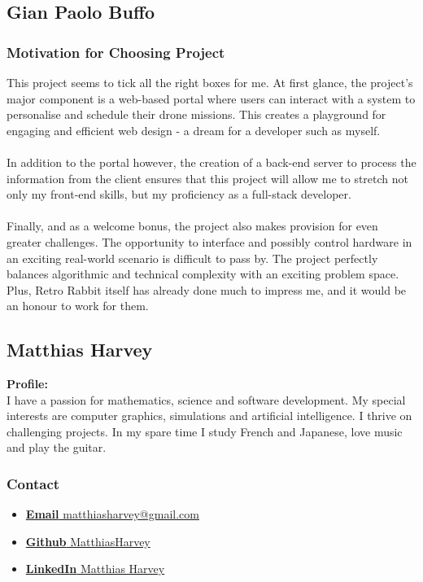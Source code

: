 \documentclass{article}
\begin{document}
	\cleardoublepage	

\subsection{Gian Paolo Buffo}

\subsubsection{Motivation for Choosing Project}
This project seems to tick all the right boxes for me. At first glance, the project's major component is a web-based portal where users can interact with a system to personalise and schedule their drone missions. This creates a playground for engaging and efficient web design - a dream for a developer such as myself.
\\\\
In addition to the portal however, the creation of a back-end server to process the information from the client ensures that this project will allow me to stretch not only my front-end skills, but my proficiency as a full-stack developer.
\\\\
Finally, and as a welcome bonus, the project also makes provision for even greater challenges. The opportunity to interface and possibly control hardware in an exciting real-world scenario is difficult to pass by. The project perfectly balances algorithmic and technical complexity with an exciting problem space. Plus, Retro Rabbit itself has already done much to impress me, and it would be an honour to work for them.    

\cleardoublepage

\subsection{Matthias Harvey}
\textbf{Profile:}\\
I have a passion for mathematics, science and software development. My special interests are computer graphics, simulations and artificial intelligence. I thrive on challenging projects. In my spare time I study French and Japanese, love music and play the guitar.
\subsubsection{Contact}
\begin{itemize}
	\item \href{mailto:matthiasharvey@gmail.com}{\textbf{Email} matthiasharvey@gmail.com}
	\item \href{https://github.com/MatthiasHarvey}{\textbf{Github} MatthiasHarvey}	
	\item \href{https://za.linkedin.com/in/matthias-harvey-68b30995}{\textbf{LinkedIn} Matthias Harvey}
\end{itemize}
\end{document}
